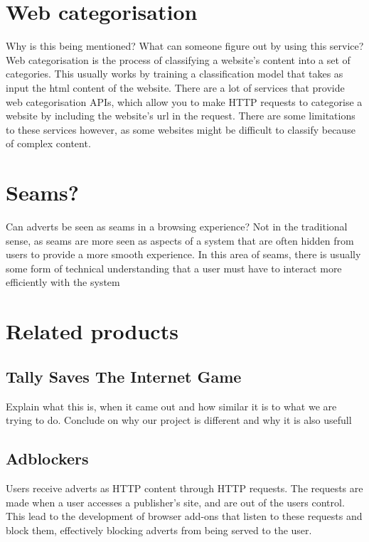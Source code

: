 \documentclass{l4proj}
\begin{document}
\section{Web categorisation}
 Why is this being mentioned? What can someone figure out by using this service?
Web categorisation is the process of classifying a website's content into a set of categories. This usually works by training a classification model that takes as input the html content of the website. There are a lot of services that provide web categorisation APIs, which allow you to make HTTP requests to categorise a website by including the website's url in the request. There are some limitations to these services however, as some websites might be difficult to classify because of complex content.

\section{Seams?}
Can adverts be seen as seams in a browsing experience? Not in the traditional sense, as seams are more seen as aspects of a system that are often hidden from users to provide a more smooth experience. In this area of seams, there is usually some form of technical understanding that a user must have to interact more efficiently with the system

\section{Related products}
\subsection{Tally Saves The Internet Game}
Explain what this is, when it came out and how similar it is to what we are trying to do. Conclude on why our project is different and why it is also usefull

\subsection{Adblockers}
Users receive adverts as HTTP content through HTTP requests. The requests are made when a user accesses a publisher's site, and are out of the users control. This lead to the development of browser add-ons that listen to these requests and block them, effectively blocking adverts from being served to the user. 
\end{document}
